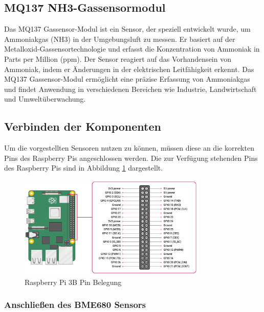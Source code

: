 \documentclass[conference]{IEEEtran}
\begin{document}
\subsection{MQ137 NH3-Gassensormodul}
Das MQ137 Gassensor-Modul ist ein Sensor, der speziell entwickelt wurde, um Ammoniakgas (NH3) in der Umgebungsluft zu messen. Er basiert auf der Metalloxid-Gassensortechnologie und erfasst die Konzentration von Ammoniak in Parts per Million (ppm). Der Sensor reagiert auf das Vorhandensein von Ammoniak, indem er Änderungen in der elektrischen Leitfähigkeit erkennt. Das MQ137 Gassensor-Modul ermöglicht eine präzise Erfassung von Ammoniakgas und findet Anwendung in verschiedenen Bereichen wie Industrie, Landwirtschaft und Umweltüberwachung.

\subsection{Verbinden der Komponenten}
Um die vorgestellten Sensoren nutzen zu können, müssen diese an die korrekten Pins des Raspberry Pis angeschlossen werden. Die zur Verfügung stehenden Pins des Raspberry Pis sind in Abbildung \ref{pi_pins} dargestellt.

\begin{figure}[H]
	\centering
	\includegraphics[width=90mm]{fig/pi_pins.png}
	\caption{Raspberry Pi 3B Pin Belegung}
	\label{pi_pins}
\end{figure}

\subsubsection{Anschließen des BME680 Sensors} 
\end{document}
